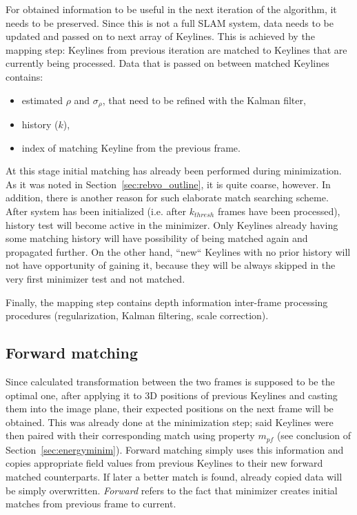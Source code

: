 For obtained information to be useful in the next iteration of the algorithm, it needs to be preserved. Since this is not a full SLAM system, data needs to be updated and passed on to next array of Keylines. This is achieved by the mapping step: Keylines from previous iteration are matched to Keylines that are currently being processed. Data that is passed on between matched Keylines contains:

\begin{itemize}
	\item estimated $\rho$ and $\sigma_{\rho}$, that need to be refined with the Kalman filter,
	\item history ($k$),
	\item index of matching Keyline from the previous frame.
\end{itemize}

At this stage initial matching has already been performed during minimization. As it was noted in Section~\ref{sec:rebvo_outline}, it is quite coarse, however. In addition, there is another reason for such elaborate match searching scheme. After system has been initialized (i.e. after $k_{thresh}$ frames have been processed), history test will become active in the minimizer. Only Keylines already having some matching history will have possibility of being matched again and propagated further. On the other hand, ``new`` Keylines with no prior history will not have opportunity of gaining it, because they will be always skipped in the very first minimizer test and not matched.

Finally, the mapping step contains depth information inter-frame processing procedures (regularization, Kalman filtering, scale correction).

\subsection{Forward matching}


Since calculated transformation between the two frames is supposed to be the optimal one, after applying it to 3D positions of previous Keylines and casting them into the image plane, their expected positions on the next frame will be obtained. This was already done at the minimization step; said Keylines were then paired with their corresponding match using property $m_{pf}$ (see conclusion of Section~\ref{sec:energyminim}). Forward matching simply uses this information and copies appropriate field values from previous Keylines to their new forward matched counterparts. If later a better match is found, already copied data will be simply overwritten. \textit{Forward} refers to the fact that minimizer creates initial matches from previous frame to current.

